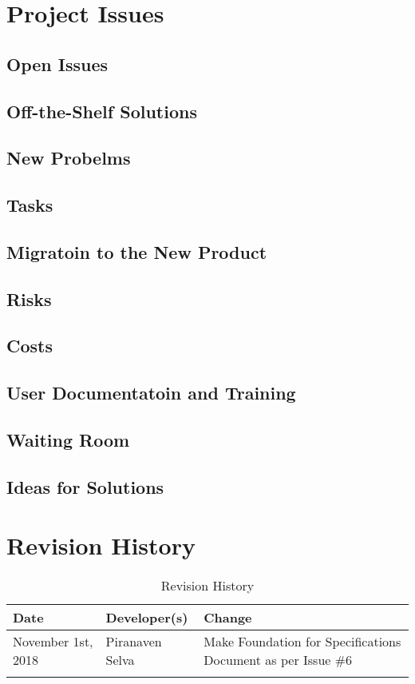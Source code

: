 \documentclass{article}
\begin{document}
\newpage
\section{Project Issues }
\subsection{Open Issues}
\subsection{Off-the-Shelf Solutions}
\subsection{New Probelms}
\subsection{Tasks}
\subsection{Migratoin to the New Product}
\subsection{Risks}
\subsection{Costs}
\subsection{User Documentatoin and Training}
\subsection{Waiting Room}
\subsection{Ideas for Solutions}




\newpage
\section{Revision History}
\begin{table}[hp]
\caption{Revision History} \label{TblRevisionHistory}
\begin{tabularx}{\textwidth}{llX}
\toprule
\textbf{Date} & \textbf{Developer(s)} & \textbf{Change}\\
\midrule
November 1st, 2018 &Piranaven Selva & Make Foundation for Specifications Document as per Issue \#6 \\
\\
\bottomrule
\end{tabularx}
\end{table}
\end{document}
